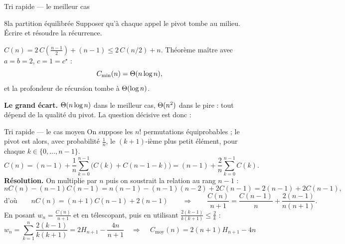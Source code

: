 \documentclass[11pt,aspectratio=169]{beamer}
\begin{document}
\begin{frame}{Tri rapide --- le meilleur cas}
\begin{exercice}{8}{la partition équilibrée}
Supposer qu'à chaque appel le pivot tombe au milieu. Écrire et résoudre la récurrence.
\end{exercice}
\pause
\begin{soluce}\small
$C(n)=2\,C\!\left(\frac{n-1}2\right)+(n-1)\le 2\,C(n/2)+n$.
Théorème maître avec $a=b=2$, $c=1=c^\star$ :
\[
C_{\min}(n)=\Theta(n\log n),
\]
et la profondeur de récursion tombe à $\Theta(\log n)$.
\end{soluce}
\vspace{4pt}
\pause
\begin{attention}\small
\textbf{Le grand écart.} $\Theta(n\log n)$ dans le meilleur cas, $\Theta(n^2)$ dans le pire :
tout dépend de la qualité du pivot. La question décisive est donc :
\end{attention}
\end{frame}

\begin{frame}{Tri rapide --- le cas moyen}
On suppose les $n!$ permutations équiprobables ; le pivot est alors, avec probabilité
$\frac1n$, le $(k+1)$-ième plus petit élément, pour chaque $k\in\{0,\dots,n-1\}$.
\[
C(n)=(n-1)+\frac1n\sum_{k=0}^{n-1}\big(C(k)+C(n-1-k)\big)
    =(n-1)+\frac2n\sum_{k=0}^{n-1}C(k).
\]
\pause
\textbf{Résolution.} On multiplie par $n$ puis on soustrait la relation au rang $n-1$ :
\[
nC(n)-(n-1)C(n-1)=n(n-1)-(n-1)(n-2)+2C(n-1)=2(n-1)+2C(n-1),
\]
\[
\text{d'où}\qquad nC(n)=(n+1)C(n-1)+2(n-1)
\qquad\Longrightarrow\qquad
\frac{C(n)}{n+1}=\frac{C(n-1)}{n}+\frac{2(n-1)}{n(n+1)} .
\]
\pause
En posant $w_n=\frac{C(n)}{n+1}$ et en télescopant, puis en utilisant
$\frac{2(k-1)}{k(k+1)}\le \frac2k$ :
\[
w_n=\sum_{k=1}^{n}\frac{2(k-1)}{k(k+1)}=2H_{n+1}-\frac{4n}{n+1}
\quad\Longrightarrow\quad
\boxed{\,C_{\text{moy}}(n)=2(n+1)H_{n+1}-4n\,}
\]
\end{frame}
\end{document}

